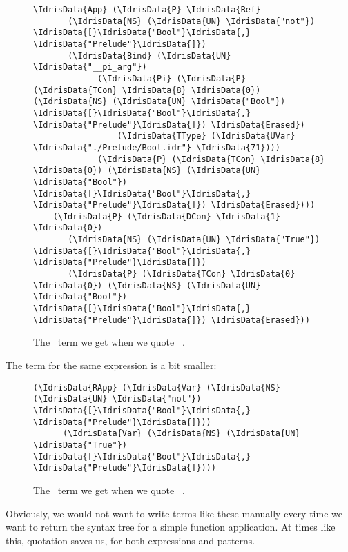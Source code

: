\begin{figure}[ht]
  \caption{The \TT\ term we get when we quote \texttt{ }.}
\begin{Verbatim}[framesep=2mm, label=\footnotesize{\normalfont{Idris}}, labelposition=topline]
\IdrisData{App} (\IdrisData{P} \IdrisData{Ref}
       (\IdrisData{NS} (\IdrisData{UN} \IdrisData{"not"}) \IdrisData{[}\IdrisData{"Bool"}\IdrisData{,} \IdrisData{"Prelude"}\IdrisData{]})
       (\IdrisData{Bind} (\IdrisData{UN} \IdrisData{"__pi_arg"})
             (\IdrisData{Pi} (\IdrisData{P} (\IdrisData{TCon} \IdrisData{8} \IdrisData{0}) (\IdrisData{NS} (\IdrisData{UN} \IdrisData{"Bool"}) \IdrisData{[}\IdrisData{"Bool"}\IdrisData{,} \IdrisData{"Prelude"}\IdrisData{]}) \IdrisData{Erased})
                 (\IdrisData{TType} (\IdrisData{UVar} \IdrisData{"./Prelude/Bool.idr"} \IdrisData{71})))
             (\IdrisData{P} (\IdrisData{TCon} \IdrisData{8} \IdrisData{0}) (\IdrisData{NS} (\IdrisData{UN} \IdrisData{"Bool"}) \IdrisData{[}\IdrisData{"Bool"}\IdrisData{,} \IdrisData{"Prelude"}\IdrisData{]}) \IdrisData{Erased})))
    (\IdrisData{P} (\IdrisData{DCon} \IdrisData{1} \IdrisData{0})
       (\IdrisData{NS} (\IdrisData{UN} \IdrisData{"True"}) \IdrisData{[}\IdrisData{"Bool"}\IdrisData{,} \IdrisData{"Prelude"}\IdrisData{]})
       (\IdrisData{P} (\IdrisData{TCon} \IdrisData{0} \IdrisData{0}) (\IdrisData{NS} (\IdrisData{UN} \IdrisData{"Bool"}) \IdrisData{[}\IdrisData{"Bool"}\IdrisData{,} \IdrisData{"Prelude"}\IdrisData{]}) \IdrisData{Erased}))
\end{Verbatim}
\end{figure}

The  term for the same expression is a bit smaller:
\begin{figure}[ht]
  \caption{The \Raw\ term we get when we quote \texttt{ }.}
\begin{Verbatim}[framesep=2mm, label=\footnotesize{\normalfont{Idris}}, labelposition=topline]
(\IdrisData{RApp} (\IdrisData{Var} (\IdrisData{NS} (\IdrisData{UN} \IdrisData{"not"}) \IdrisData{[}\IdrisData{"Bool"}\IdrisData{,} \IdrisData{"Prelude"}\IdrisData{]}))
      (\IdrisData{Var} (\IdrisData{NS} (\IdrisData{UN} \IdrisData{"True"}) \IdrisData{[}\IdrisData{"Bool"}\IdrisData{,} \IdrisData{"Prelude"}\IdrisData{]})))
\end{Verbatim}
\end{figure}

Obviously, we would not want to write terms like these manually every time we want to return
the syntax tree for a simple function application.
At times like this, quotation saves us, for both expressions and patterns.

